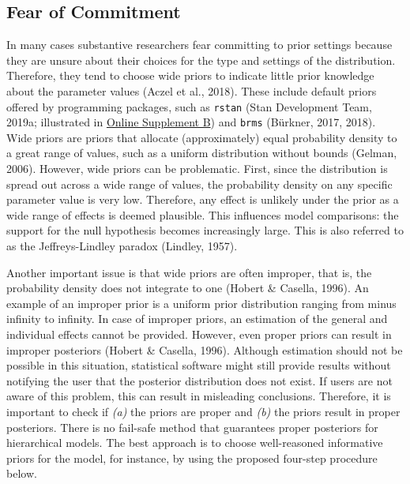 \documentclass[
  english,
  doc,floatsintext]{apa6}
\begin{document}
\hypertarget{fear-of-commitment}{%
\subsection{Fear of Commitment}\label{fear-of-commitment}}

In many cases substantive researchers fear committing to prior settings because they are unsure about their choices for the type and settings of the distribution. Therefore, they tend to choose wide priors to indicate little prior knowledge about the parameter values (Aczel et al., 2018). These include default priors offered by programming packages, such as \texttt{rstan} (Stan Development Team, 2019a; illustrated in \href{https://github.com/MyrtheV/Bayesian-Hierarchical-Modelling-An-Introduction-and-Reassessment/blob/main/B\%20-\%20Default\%20Priors\%20Rstan/Online-Supplement-B---Default-Priors-Rstan.pdf}{Online Supplement B}) and \texttt{brms} (Bürkner, 2017, 2018). Wide priors are priors that allocate (approximately) equal probability density to a great range of values, such as a uniform distribution without bounds (Gelman, 2006). However, wide priors can be problematic. First, since the distribution is spread out across a wide range of values, the probability density on any specific parameter value is very low. Therefore, any effect is unlikely under the prior as a wide range of effects is deemed plausible. This influences model comparisons: the support for the null hypothesis becomes increasingly large. This is also referred to as the Jeffreys-Lindley paradox (Lindley, 1957).

Another important issue is that wide priors are often improper, that is, the probability density does not integrate to one (Hobert \& Casella, 1996). An example of an improper prior is a uniform prior distribution ranging from minus infinity to infinity. In case of improper priors, an estimation of the general and individual effects cannot be provided. However, even proper priors can result in improper posteriors (Hobert \& Casella, 1996). Although estimation should not be possible in this situation, statistical software might still provide results without notifying the user that the posterior distribution does not exist. If users are not aware of this problem, this can result in misleading conclusions. Therefore, it is important to check if \emph{(a)} the priors are proper and \emph{(b)} the priors result in proper posteriors. There is no fail-safe method that guarantees proper posteriors for hierarchical models. The best approach is to choose well-reasoned informative priors for the model, for instance, by using the proposed four-step procedure below.
\end{document}
